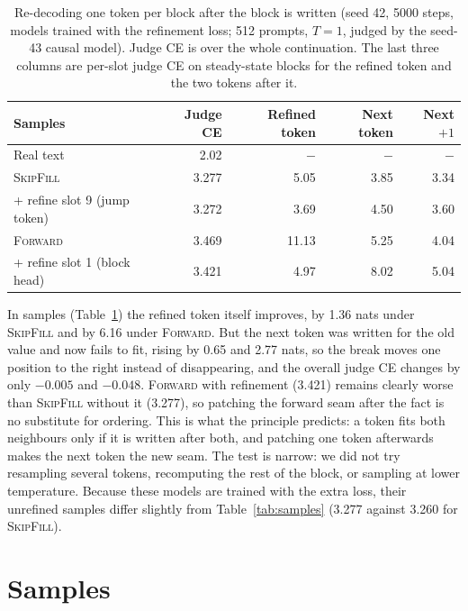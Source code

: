 \documentclass{article}
\theoremstyle{definition}
\theoremstyle{remark}
\newcommand{\name}[1]{\textup{\textsc{#1}}}
\newcommand{\sfill}{\name{SkipFill}\xspace}
\newcommand{\fwd}{\name{Forward}\xspace}
\begin{document}
\begin{table}[t]
  \centering
  \caption{Re-decoding one token per block after the block is written (seed 42, 5000 steps, models trained with the refinement loss; 512 prompts, $T=1$, judged by the seed-43 causal model). Judge CE is over the whole continuation. The last three columns are per-slot judge CE on steady-state blocks for the refined token and the two tokens after it.}
  \label{tab:refine}
  \small
  \begin{tabular}{lrrrr}
    \toprule
    Samples & Judge CE & Refined token & Next token & Next $+1$ \\
    \midrule
    Real text                                   & 2.02  & $-$   & $-$  & $-$  \\
    \sfill                                      & 3.277 & 5.05  & 3.85 & 3.34 \\
    \quad + refine slot 9 (jump token)          & 3.272 & 3.69  & 4.50 & 3.60 \\
    \fwd                                        & 3.469 & 11.13 & 5.25 & 4.04 \\
    \quad + refine slot 1 (block head)          & 3.421 & 4.97  & 8.02 & 5.04 \\
    \bottomrule
  \end{tabular}
\end{table}

In samples (Table~\ref{tab:refine}) the refined token itself improves, by 1.36 nats under \sfill and by 6.16 under \fwd.
But the next token was written for the old value and now fails to fit, rising by 0.65 and 2.77 nats, so the break moves one position to the right instead of disappearing, and the overall judge CE changes by only $-0.005$ and $-0.048$.
\fwd with refinement (3.421) remains clearly worse than \sfill without it (3.277), so patching the forward seam after the fact is no substitute for ordering.
This is what the principle predicts: a token fits both neighbours only if it is written after both, and patching one token afterwards makes the next token the new seam.
The test is narrow: we did not try resampling several tokens, recomputing the rest of the block, or sampling at lower temperature.
Because these models are trained with the extra loss, their unrefined samples differ slightly from Table~\ref{tab:samples} (3.277 against 3.260 for \sfill).

\section{Samples}
\label{app:samples}
\end{document}
